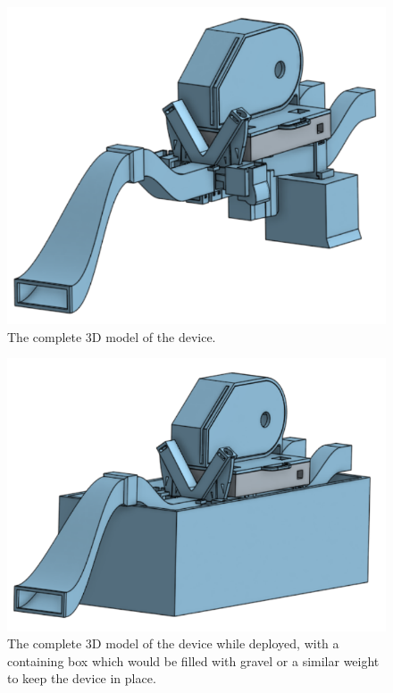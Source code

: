 \documentclass[fleqn,10pt]{SelfArx} %
\begin{document}
	\begin{figure}[h]
		\centering
		\includegraphics[width=1\linewidth]{Figures/CADFull}
		\caption[Complete 3D Model]{The complete 3D model of the device.}
		\label{fig:FullCAD}
	\end{figure}
	\begin{figure}[h]
		\centering
		\includegraphics[width=1\linewidth]{Figures/CADFullBox}
		\caption[]{The complete 3D model of the device while deployed, with a containing box which would be filled with gravel or a similar weight to keep the device in place.}
		\label{fig:FullCADBox}
	\end{figure}
\end{document}
